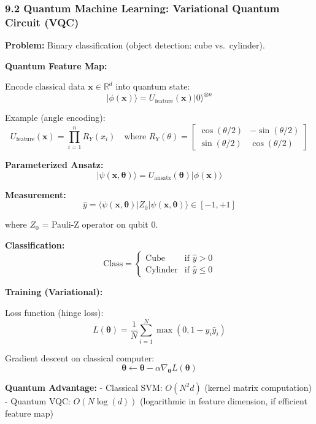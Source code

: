 \documentclass[
]{article}
\begin{document}
\hypertarget{quantum-machine-learning-variational-quantum-circuit-vqc}{%
\subsubsection{9.2 Quantum Machine Learning: Variational Quantum Circuit
(VQC)}\label{quantum-machine-learning-variational-quantum-circuit-vqc}}

\textbf{Problem:} Binary classification (object detection: cube
vs.~cylinder).

\textbf{Quantum Feature Map:}

Encode classical data \(\mathbf{x} \in \mathbb{R}^d\) into quantum
state: \[
|\phi(\mathbf{x})\rangle = U_{\text{feature}}(\mathbf{x}) |0\rangle^{\otimes n}
\]

Example (angle encoding): \[
U_{\text{feature}}(\mathbf{x}) = \prod_{i=1}^n R_Y(x_i) \quad \text{where } R_Y(\theta) = \begin{bmatrix} \cos(\theta/2) & -\sin(\theta/2) \\ \sin(\theta/2) & \cos(\theta/2) \end{bmatrix}
\]

\textbf{Parameterized Ansatz:} \[
|\psi(\mathbf{x}, \boldsymbol{\theta})\rangle = U_{\text{ansatz}}(\boldsymbol{\theta}) |\phi(\mathbf{x})\rangle
\]

\textbf{Measurement:} \[
\hat{y} = \langle \psi(\mathbf{x}, \boldsymbol{\theta}) | Z_0 | \psi(\mathbf{x}, \boldsymbol{\theta}) \rangle \in [-1, +1]
\]

where \(Z_0\) = Pauli-Z operator on qubit 0.

\textbf{Classification:} \[
\text{Class} =
\begin{cases}
\text{Cube} & \text{if } \hat{y} > 0 \\
\text{Cylinder} & \text{if } \hat{y} \leq 0
\end{cases}
\]

\textbf{Training (Variational):}

Loss function (hinge loss): \[
L(\boldsymbol{\theta}) = \frac{1}{N} \sum_{i=1}^N \max(0, 1 - y_i \hat{y}_i)
\]

Gradient descent on classical computer: \[
\boldsymbol{\theta} \leftarrow \boldsymbol{\theta} - \alpha \nabla_{\boldsymbol{\theta}} L(\boldsymbol{\theta})
\]

\textbf{Quantum Advantage:} - Classical SVM: \(O(N^2 d)\) (kernel matrix
computation) - Quantum VQC: \(O(N \log(d))\) (logarithmic in feature
dimension, if efficient feature map)
\end{document}
